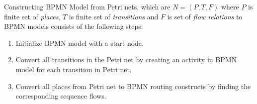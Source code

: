\theoremstyle{definition}
\begin{definition}
Constructing BPMN Model from Petri nets, which are $N = (P, T, F)$ where $P$ is finite set of \textit{places}, $T$ is finite set of \textit{transitions} and $F$ is set of \textit{flow relations} to BPMN models consists of the following steps:
\begin{enumerate}
  \item Initialize BPMN model with a start node.
  \item Convert all transitions in the Petri net by creating an activity in BPMN model for each transition in Petri net.
  \item Convert all places from Petri net to BPMN routing constructs by finding the corresponding sequence flows.
\end{enumerate}
\end{definition}

